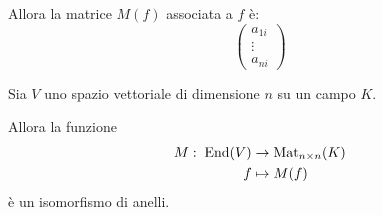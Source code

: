\documentclass[../main.tex]{subfiles}
\begin{document}
Allora la matrice $M(f)$ associata a $f$ è:
\begin{equation*}
    \begin{pmatrix}
        a_{1i} \\
        \vdots \\
        a_{ni}
    \end{pmatrix}
\end{equation*}

\begin{theorem}
    Sia $V$ uno spazio vettoriale di dimensione $n$ su un campo $K$.

    Allora la funzione
    \begin{align*}
        M : \; \operatorname{End}(V) & \rightarrow \operatorname{Mat}_{n \times n}(K) \\
        f              & \mapsto M(f)
    \end{align*}
    è un isomorfismo di anelli.
\end{theorem}
\end{document}
